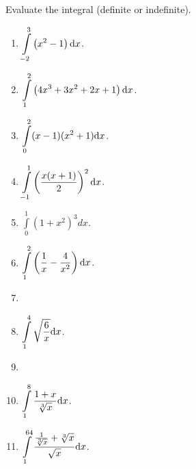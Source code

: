 Evaluate the integral (definite or indefinite).
\begin{multicols}{3}
\begin{enumerate}[ref={\fcProblemRef}]
\item $\displaystyle \int\limits_{-2}^{3} \left(x^2-1 \right)  {\normalfont \text{d}} x$.


\item $\displaystyle \int\limits_{1}^{2} \left(4x^3+3x^2+2x+1\right)  {\normalfont \text{d}} x$.

\item $\displaystyle \int\limits_{0}^{2}(x-1)(x^2+1)  {\normalfont \text{d}} x$.

\item $\displaystyle \int\limits_{-1}^{1} \left( \frac{x(x+1) }{ 2} \right)^2  {\normalfont \text{d}} x$.

\item $\displaystyle \int\limits_{0}^{1}(1+x^2)^3 dx$.

\item $\displaystyle \int \limits_{1}^{2} \left(\frac{1}{x} - \frac{4}{x^2} \right)  {\normalfont \text{d}} x$.

\item 
\item $\displaystyle \int\limits_{1}^{4} \sqrt{ \frac{6 }{x }} {\normalfont \text{d}} x$.

\item 
\item $\displaystyle \int \limits_{1}^{8} \frac{1+x}{ \sqrt[3]{x}} {\normalfont \text{d}} x$.

\item $\displaystyle \int\limits_{1}^{64} \frac{\frac{1}{ \sqrt[3]{x}} +\sqrt[3]{x}}{ \sqrt{x}}{\normalfont \text{d}} x$.


\end{enumerate}
\end{multicols}
